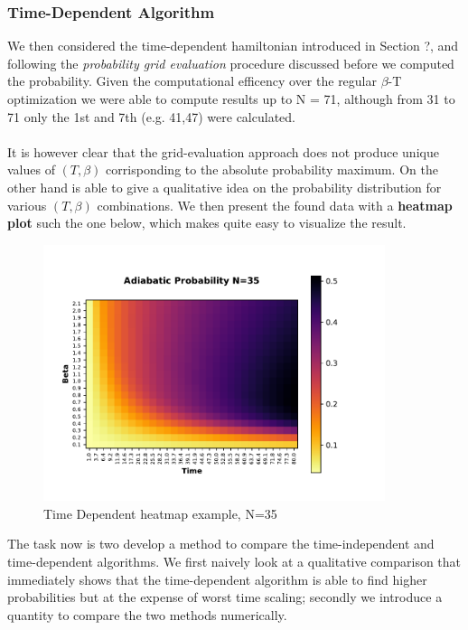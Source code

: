 \documentclass[aps,pra,reprint, onecolumn]{revtex4-2}
\begin{document}
\subsubsection{\textbf{Time-Dependent Algorithm}}
We then considered the time-dependent hamiltonian introduced in Section ?, and following the \textit{probability grid evaluation} procedure discussed before we computed the probability. Given the computational efficency over the regular $\beta$-T optimization we were able to compute results up to N = 71, although from 31 to 71 only the 1st and 7th (e.g. 41,47) were calculated. \\ \\
It is however clear that the grid-evaluation approach does not produce unique values of $(T,\beta)$ corrisponding to the absolute probability maximum. On the other hand is able to give a qualitative idea on the probability distribution for various $(T,\beta)$ combinations. We then present the found data with a \textbf{heatmap plot} such the one below, which makes quite easy to visualize the result.
\begin{figure}[ht]
\includegraphics[width=10cm]{./figures/example.pdf}%
\caption{Time Dependent heatmap example, N=35}
\end{figure}

The task now is two develop a method to compare the time-independent and time-dependent algorithms. We first naively look at a qualitative comparison that immediately shows that the time-dependent algorithm is able to find higher probabilities but at the expense of worst time scaling; secondly we introduce a quantity to compare the two methods numerically.
\end{document}
